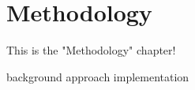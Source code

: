 \chapter{Methodology}

This is the "Methodology" chapter!

{background}
{approach}
{implementation}
